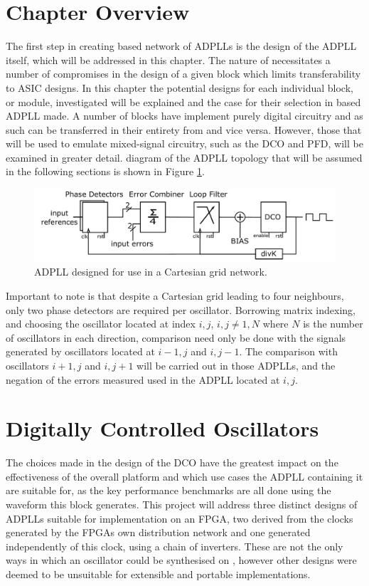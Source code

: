 \section{Chapter Overview}
The first step in creating  based network of \acp{ADPLL} is the design of the \ac{ADPLL} itself, which will be addressed in this chapter. The nature of  necessitates a number of compromises in the design of a given block which limits transferability to \ac{ASIC} designs. In this chapter the potential designs for each individual block, or module, investigated will be explained and the case for their selection in  based \ac{ADPLL} made. A number of blocks have implement purely digital circuitry and as such can be transferred in their entirety from  and vice versa. However, those that will be used to emulate mixed-signal circuitry, such as the \ac{DCO} and \ac{PFD}, will be examined in greater detail.  diagram of the \ac{ADPLL} topology that will be assumed in the following sections is shown in Figure \ref{fig:network_adpll}.
\begin{figure}[h]
	\centering
	\includegraphics[width=\textwidth]{../network_adpll}
	\caption{\ac{ADPLL} designed for use in a Cartesian grid network.}
	\label{fig:network_adpll}
\end{figure}

Important to note is that despite a Cartesian grid leading to four neighbours, only two phase detectors are required per oscillator. Borrowing matrix indexing, and choosing the oscillator located at index $i,j$, $i,j \neq 1,N$ where $N$ is the number of oscillators in each direction, comparison need only be done with the signals generated by oscillators located at $i-1,j$ and $i,j-1$. The comparison with oscillators $i+1,j$ and $i,j+1$ will be carried out in those \acp{ADPLL}, and the negation of the errors measured used in the \ac{ADPLL} located at $i,j$.

\section{Digitally Controlled Oscillators}
The choices made in the design of the \ac{DCO} have the greatest impact on the effectiveness of the overall platform and which use cases the \ac{ADPLL} containing it are suitable for, as the key performance benchmarks are all done using the waveform this block generates. This project will address three distinct designs of \acp{ADPLL} suitable for implementation on an FPGA, two derived from the clocks generated by the \acp{FPGA} own distribution network and one generated independently of this clock, using a chain of inverters. These are not the only ways in which an oscillator could be synthesised on , however other designs were deemed to be unsuitable for extensible and portable implementations.

